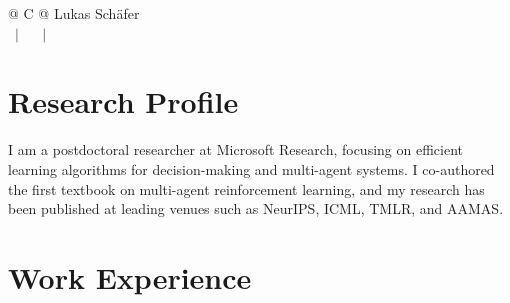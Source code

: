 \documentclass[a4paper,12pt]{article}
\begin{document}
\nocite{*}

\pagestyle{empty} 



\begin{tabularx}{\linewidth}{@{} C @{}}
\Huge{Lukas Sch\"afer} \\[7.5pt]
 \ $|$ \
 \ $|$ \
\end{tabularx}

\section{Research Profile}
I am a postdoctoral researcher at Microsoft Research, focusing on efficient learning algorithms for decision-making and multi-agent systems. I co-authored the first textbook on multi-agent reinforcement learning, and my research has been published at leading venues such as NeurIPS, ICML, TMLR, and AAMAS. 


\section{Work Experience}
\end{document}
